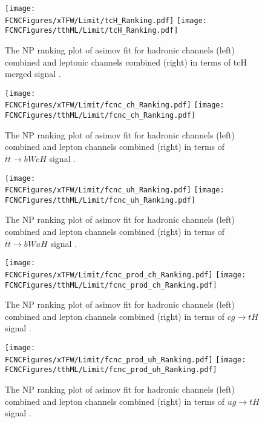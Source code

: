 \begin{figure}[htb]
\centering
\texttt{[image: \\FCNCFigures/xTFW/Limit/tcH\_Ranking.pdf]}
\texttt{[image: \\FCNCFigures/tthML/Limit/tcH\_Ranking.pdf]}
\caption{ The NP ranking plot of asimov fit for hadronic channels (left) combined and leptonic channels combined (right) in terms of tcH merged signal . }
\label{fig:tcH_Ranking}
\end{figure}

\begin{figure}[htb]
\centering
\texttt{[image: \\FCNCFigures/xTFW/Limit/fcnc\_ch\_Ranking.pdf]}
\texttt{[image: \\FCNCFigures/tthML/Limit/fcnc\_ch\_Ranking.pdf]}
\caption{ The NP ranking plot of asimov fit for hadronic channels (left) combined and lepton channels combined (right) in terms of $\bar{t}t\to bWcH$ signal . }
\label{fig:fcnc_ch_Ranking}
\end{figure}

\begin{figure}[htb]
\centering
\texttt{[image: \\FCNCFigures/xTFW/Limit/fcnc\_uh\_Ranking.pdf]}
\texttt{[image: \\FCNCFigures/tthML/Limit/fcnc\_uh\_Ranking.pdf]}
\caption{ The NP ranking plot of asimov fit for hadronic channels (left) combined and lepton channels combined (right) in terms of $\bar{t}t\to bWuH$ signal . }
\label{fig:fcnc_uh_Ranking}
\end{figure}

\begin{figure}[htb]
\centering
\texttt{[image: \\FCNCFigures/xTFW/Limit/fcnc\_prod\_ch\_Ranking.pdf]}
\texttt{[image: \\FCNCFigures/tthML/Limit/fcnc\_prod\_ch\_Ranking.pdf]}
\caption{ The NP ranking plot of asimov fit for hadronic channels (left) combined and lepton channels combined (right) in terms of $cg\to tH$ signal . }
\label{fig:fcnc_prod_ch_Ranking}
\end{figure}

\begin{figure}[htb]
\centering
\texttt{[image: \\FCNCFigures/xTFW/Limit/fcnc\_prod\_uh\_Ranking.pdf]}
\texttt{[image: \\FCNCFigures/tthML/Limit/fcnc\_prod\_uh\_Ranking.pdf]}
\caption{ The NP ranking plot of asimov fit for hadronic channels (left) combined and lepton channels combined (right) in terms of $ug\to tH$ signal . }
\label{fig:fcnc_prod_uh_Ranking}
\end{figure}
